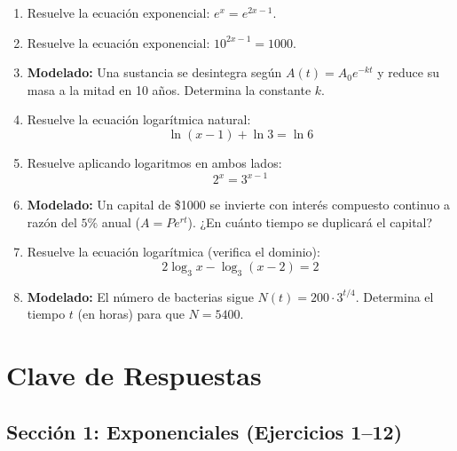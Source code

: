 \documentclass[12pt, letterpaper]{article}
\begin{document}
\begin{enumerate}[resume=ejercicios, leftmargin=*]
  \item \facil{} Resuelve la ecuación exponencial: $e^x = e^{2x - 1}$.

  \item \medio{} Resuelve la ecuación exponencial: $10^{2x - 1} = 1000$.

  \item \medio{} \textbf{Modelado:} Una sustancia se desintegra según $A(t) = A_0 e^{-kt}$ y reduce su masa a la mitad en 10 años. Determina la constante $k$.

  \item \medio{} Resuelve la ecuación logarítmica natural:
        $$\ln(x - 1) + \ln 3 = \ln 6$$

  \item \dificil{} Resuelve aplicando logaritmos en ambos lados:
        $$2^x = 3^{x - 1}$$

  \item \dificil{} \textbf{Modelado:} Un capital de \$1000 se invierte con interés compuesto continuo a razón del $5\%$ anual ($A = Pe^{rt}$). ¿En cuánto tiempo se duplicará el capital?

  \item \muyDificil{} Resuelve la ecuación logarítmica (verifica el dominio):
        $$2 \log_3 x - \log_3 (x - 2) = 2$$

  \item \muyDificil{} \textbf{Modelado:} El número de bacterias sigue $N(t) = 200 \cdot 3^{t/4}$. Determina el tiempo $t$ (en horas) para que $N = 5400$.
\end{enumerate}
\newpage
\ifmwclaves
\section{Clave de Respuestas}

\subsection*{Sección 1: Exponenciales (Ejercicios 1--12)}
\end{document}
